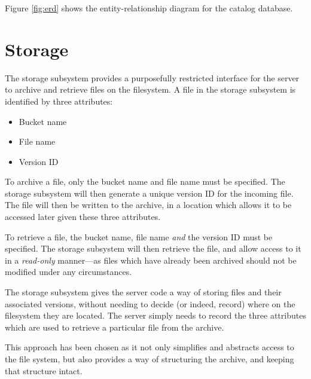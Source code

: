 Figure \ref{fig:erd} shows the entity-relationship diagram for the catalog
database.

\section{Storage}

The storage subsystem provides a purposefully restricted interface for the
server to archive and retrieve files on the filesystem. A file in the storage
subsystem is identified by three attributes:

\begin{itemize}
    \item Bucket name
    \item File name
    \item Version ID
\end{itemize}

To archive a file, only the bucket name and file name must be specified. The
storage subsystem will then generate a unique version ID for the incoming file.
The file will then be written to the archive, in a location which allows it to
be accessed later given these three attributes.

To retrieve a file, the bucket name, file name \emph{and} the version ID must
be specified. The storage subsystem will then retrieve the file, and allow
access to it in a \emph{read-only} manner---as files which have already been
archived should not be modified under any circumstances.

The storage subsystem gives the server code a way of storing files and their
associated versions, without needing to decide (or indeed, record) where on the
filesystem they are located. The server simply needs to record the three
attributes which are used to retrieve a particular file from the archive.

This approach has been chosen as it not only simplifies and abstracts access to
the file system, but also provides a way of structuring the archive, and
keeping that structure intact.

